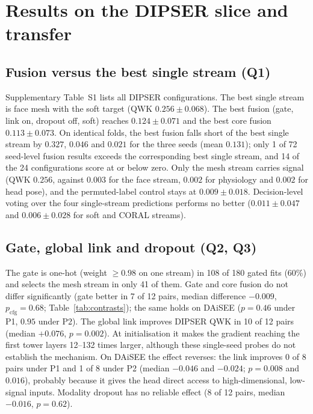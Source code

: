 \section{Results on the DIPSER slice and transfer}
\label{sec:results}

\subsection{Fusion versus the best single stream (Q1)}
Supplementary Table~S1 lists all DIPSER configurations. The best single stream is face mesh with the soft target (QWK $0.256\pm0.068$). The best fusion (gate, link on, dropout off, soft) reaches $0.124\pm0.071$ and the best core fusion $0.113\pm0.073$. On identical folds, the best fusion falls short of the best single stream by $0.327$, $0.046$ and $0.021$ for the three seeds (mean $0.131$); only 1 of 72 seed-level fusion results exceeds the corresponding best single stream, and 14 of the 24 configurations score at or below zero. Only the mesh stream carries signal (QWK $0.256$, against $0.003$ for the face stream, $0.002$ for physiology and $0.002$ for head pose), and the permuted-label control stays at $0.009\pm0.018$. Decision-level voting over the four single-stream predictions performs no better ($0.011\pm0.047$ and $0.006\pm0.028$ for soft and CORAL streams).

\subsection{Gate, global link and dropout (Q2, Q3)}
The gate is one-hot (weight $\ge0.98$ on one stream) in 108 of 180 gated fits (60\%) and selects the mesh stream in only 41 of them. Gate and core fusion do not differ significantly (gate better in 7 of 12 pairs, median difference $-0.009$, $p_{\text{cfg}}=0.68$; Table~\ref{tab:contrasts}); the same holds on DAiSEE ($p=0.46$ under P1, $0.95$ under P2). The global link improves DIPSER QWK in 10 of 12 pairs (median $+0.076$, $p=0.002$). At initialisation it makes the gradient reaching the first tower layers 12--132 times larger, although these single-seed probes do not establish the mechanism. On DAiSEE the effect reverses: the link improves 0 of 8 pairs under P1 and 1 of 8 under P2 (median $-0.046$ and $-0.024$; $p=0.008$ and $0.016$), probably because it gives the head direct access to high-dimensional, low-signal inputs. Modality dropout has no reliable effect (8 of 12 pairs, median $-0.016$, $p=0.62$).

